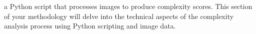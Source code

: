 
a Python script that processes images to produce complexity scores.
This section of your methodology will delve into the technical aspects of the complexity analysis process using Python scripting and image data.